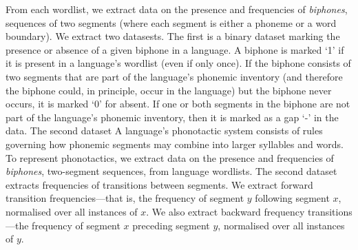 From each wordlist, we extract data on the presence and frequencies of \emph{biphones}, sequences of two segments (where each segment is either a phoneme or a word boundary). We extract two datasests. The first is a binary dataset marking the presence or absence of a given biphone in a language. A biphone is marked `1' if it is present in a language's wordlist (even if only once). If the biphone consists of two segments that are part of the language's phonemic inventory (and therefore the biphone could, in principle, occur in the language) but the biphone never occurs, it is marked `0' for absent. If one or both segments in the biphone are not part of the language's phonemic inventory, then it is marked as a gap `-' in the data. The second dataset A language's phonotactic system consists of rules governing how phonemic segments may combine into larger syllables and words. To represent phonotactics, we extract data on the presence and frequencies of \emph{biphones}, two-segment sequences, from language wordlists. The second dataset extracts frequencies of transitions between segments. We extract forward transition frequencies---that is, the frequency of segment \(y\) following segment \(x\), normalised over all instances of \(x\). We also extract backward frequency transitions---the frequency of segment \(x\) preceding segment \(y\), normalised over all instances of \(y\).

